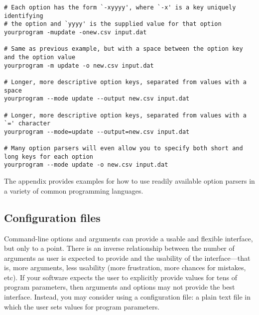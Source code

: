 \documentclass{article}
\begin{document}
\begin{verbatim}
# Each option has the form `-xyyyy', where `-x' is a key uniquely identifying
# the option and `yyyy' is the supplied value for that option
yourprogram -mupdate -onew.csv input.dat

# Same as previous example, but with a space between the option key and the option value
yourprogram -m update -o new.csv input.dat

# Longer, more descriptive option keys, separated from values with a space
yourprogram --mode update --output new.csv input.dat

# Longer, more descriptive option keys, separated from values with a `=' character
yourprogram --mode=update --output=new.csv input.dat

# Many option parsers will even allow you to specify both short and long keys for each option
yourprogram --mode update -o new.csv input.dat
\end{verbatim}

The appendix provides examples for how to use readily available option parsers in a variety of common programming languages.

\subsection{Configuration files}
Command-line options and arguments can provide a usable and flexible interface, but only to a point. There is an inverse relationship between the number of arguments as user is expected to provide and the usability of the interface---that is, more arguments, less usability (more frustration, more chances for mistakes, etc). If your software expects the user to explicitly provide values for tens of program parameters, then arguments and options may not provide the best interface. Instead, you may consider using a configuration file: a plain text file in which the user sets values for program parameters.
\end{document}
